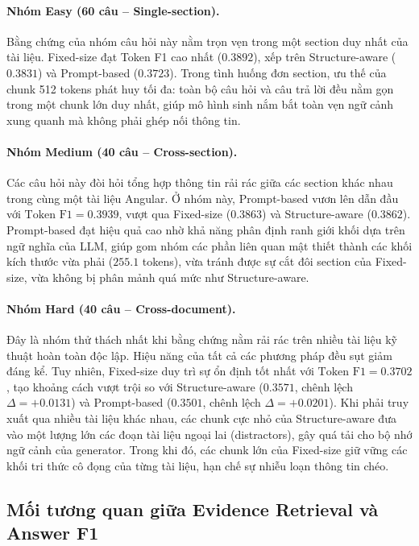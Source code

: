\paragraph{Nhóm Easy (60 câu -- Single-section).}
Bằng chứng của nhóm câu hỏi này nằm trọn vẹn trong một section duy nhất của tài liệu. Fixed-size đạt Token F1 cao nhất ($0.3892$), xếp trên Structure-aware ($0.3831$) và Prompt-based ($0.3723$). Trong tình huống đơn section, ưu thế của chunk 512 tokens phát huy tối đa: toàn bộ câu hỏi và câu trả lời đều nằm gọn trong một chunk lớn duy nhất, giúp mô hình sinh nắm bắt toàn vẹn ngữ cảnh xung quanh mà không phải ghép nối thông tin.

\paragraph{Nhóm Medium (40 câu -- Cross-section).}
Các câu hỏi này đòi hỏi tổng hợp thông tin rải rác giữa các section khác nhau trong cùng một tài liệu Angular. Ở nhóm này, Prompt-based vươn lên dẫn đầu với $\text{Token F1} = 0.3939$, vượt qua Fixed-size ($0.3863$) và Structure-aware ($0.3862$). Prompt-based đạt hiệu quả cao nhờ khả năng phân định ranh giới khối dựa trên ngữ nghĩa của LLM, giúp gom nhóm các phần liên quan mật thiết thành các khối kích thước vừa phải ($255.1$ tokens), vừa tránh được sự cắt đôi section của Fixed-size, vừa không bị phân mảnh quá mức như Structure-aware.

\paragraph{Nhóm Hard (40 câu -- Cross-document).}
Đây là nhóm thử thách nhất khi bằng chứng nằm rải rác trên nhiều tài liệu kỹ thuật hoàn toàn độc lập. Hiệu năng của tất cả các phương pháp đều sụt giảm đáng kể. Tuy nhiên, Fixed-size duy trì sự ổn định tốt nhất với $\text{Token F1} = 0.3702$, tạo khoảng cách vượt trội so với Structure-aware ($0.3571$, chênh lệch $\Delta = +0.0131$) và Prompt-based ($0.3501$, chênh lệch $\Delta = +0.0201$). Khi phải truy xuất qua nhiều tài liệu khác nhau, các chunk cực nhỏ của Structure-aware đưa vào một lượng lớn các đoạn tài liệu ngoại lai (distractors), gây quá tải cho bộ nhớ ngữ cảnh của generator. Trong khi đó, các chunk lớn của Fixed-size giữ vững các khối tri thức cô đọng của từng tài liệu, hạn chế sự nhiễu loạn thông tin chéo.

\subsection{Mối tương quan giữa Evidence Retrieval và Answer F1}
\label{subsec:correlation_analysis}


